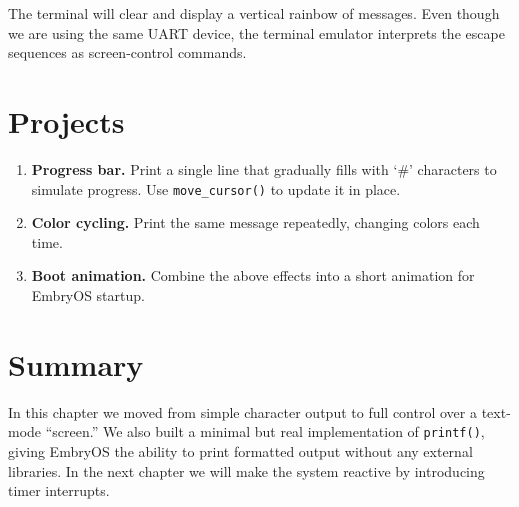 The terminal will clear and display a vertical rainbow of messages.  Even
though we are using the same UART device, the terminal emulator interprets the
escape sequences as screen-control commands.

\section{Projects}

\begin{enumerate}
  \item \textbf{Progress bar.}
        Print a single line that gradually fills with `\#' characters to
        simulate progress.  Use \texttt{move\_cursor()} to update it in place.
  \item \textbf{Color cycling.}
        Print the same message repeatedly, changing colors each time.
  \item \textbf{Boot animation.}
        Combine the above effects into a short animation for EmbryOS startup.
\end{enumerate}

\section*{Summary}

In this chapter we moved from simple character output to full control over a
text-mode ``screen.''  We also built a minimal but real implementation of
\texttt{printf()}, giving EmbryOS the ability to print formatted output without
any external libraries.  In the next chapter we will make the system reactive
by introducing timer interrupts.
